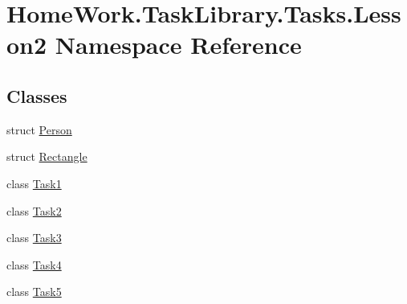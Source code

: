 \hypertarget{namespace_home_work_1_1_task_library_1_1_tasks_1_1_lesson2}{}\section{Home\+Work.\+Task\+Library.\+Tasks.\+Lesson2 Namespace Reference}
\label{namespace_home_work_1_1_task_library_1_1_tasks_1_1_lesson2}
\subsection*{Classes}
\begin{DoxyCompactItemize}
\item 
struct \mbox{\hyperlink{struct_home_work_1_1_task_library_1_1_tasks_1_1_lesson2_1_1_person}{Person}}
\item 
struct \mbox{\hyperlink{struct_home_work_1_1_task_library_1_1_tasks_1_1_lesson2_1_1_rectangle}{Rectangle}}
\item 
class \mbox{\hyperlink{class_home_work_1_1_task_library_1_1_tasks_1_1_lesson2_1_1_task1}{Task1}}
\item 
class \mbox{\hyperlink{class_home_work_1_1_task_library_1_1_tasks_1_1_lesson2_1_1_task2}{Task2}}
\item 
class \mbox{\hyperlink{class_home_work_1_1_task_library_1_1_tasks_1_1_lesson2_1_1_task3}{Task3}}
\item 
class \mbox{\hyperlink{class_home_work_1_1_task_library_1_1_tasks_1_1_lesson2_1_1_task4}{Task4}}
\item 
class \mbox{\hyperlink{class_home_work_1_1_task_library_1_1_tasks_1_1_lesson2_1_1_task5}{Task5}}
\end{DoxyCompactItemize}
